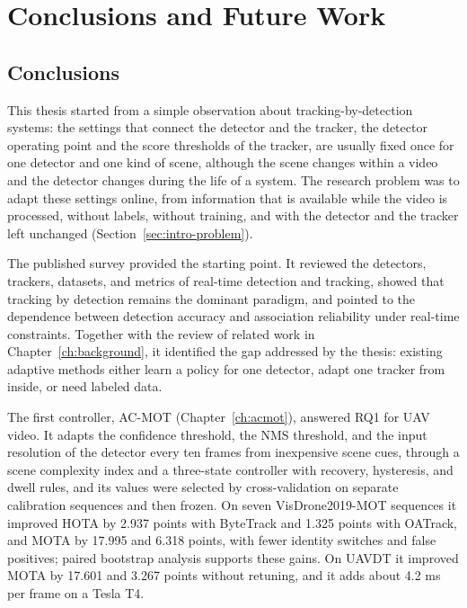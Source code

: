 \chapter{Conclusions and Future Work}\label{ch:conclusions}

\section{Conclusions}\label{sec:conc-conclusion}
This thesis started from a simple observation about tracking-by-detection systems: the settings that connect the detector and the tracker, the detector operating point and the score thresholds of the tracker, are usually fixed once for one detector and one kind of scene, although the scene changes within a video and the detector changes during the life of a system. The research problem was to adapt these settings online, from information that is available while the video is processed, without labels, without training, and with the detector and the tracker left unchanged (Section~\ref{sec:intro-problem}).

The published survey \cite{ismail2026realtime} provided the starting point. It reviewed the detectors, trackers, datasets, and metrics of real-time detection and tracking, showed that tracking by detection remains the dominant paradigm, and pointed to the dependence between detection accuracy and association reliability under real-time constraints. Together with the review of related work in Chapter~\ref{ch:background}, it identified the gap addressed by the thesis: existing adaptive methods either learn a policy for one detector, adapt one tracker from inside, or need labeled data.

The first controller, AC-MOT (Chapter~\ref{ch:acmot}), answered RQ1 for UAV video. It adapts the confidence threshold, the NMS threshold, and the input resolution of the detector every ten frames from inexpensive scene cues, through a scene complexity index and a three-state controller with recovery, hysteresis, and dwell rules, and its values were selected by cross-validation on separate calibration sequences and then frozen. On seven VisDrone2019-MOT sequences it improved HOTA by 2.937 points with ByteTrack and 1.325 points with OATrack, and MOTA by 17.995 and 6.318 points, with fewer identity switches and false positives; paired bootstrap analysis supports these gains. On UAVDT it improved MOTA by 17.601 and 3.267 points without retuning, and it adds about 4.2 ms per frame on a Tesla T4.

